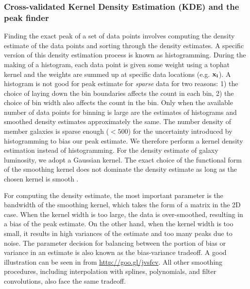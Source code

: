 \subsubsection{Cross-validated Kernel Density Estimation (KDE) and the peak finder} 
\label{subsubsec:KDE}
Finding the exact peak of a set of data points 
involves computing the density estimate of the data points and sorting through
the density estimates. A specific version of this density estimation process is
known as histogramming. During the making of a histogram, each data point is
given some weight using a tophat kernel and the weights are summed up at
specific data locations (e.g. $\bf{x}_i$). 
A histogram is not good for peak estimate for {\it sparse} data for two reasons: 1) the
choice of laying down the bin boundaries affects the count in each bin, 2) the choice of
bin width also affects the count in the bin. Only when the available number of data points
for binning is large are the estimates of histograms and smoothed density
estimates approximately the same. The number density of member galaxies  
is sparse enough ($< 500$) for the uncertainty introduced by histogramming 
to bias our peak estimate. We therefore perform a kernel density estimation
instead of histogramming. 
For the density estimate of galaxy luminosity, 
we adopt a Gaussian kernel. 
The exact choice of the functional form of the smoothing kernel does
not dominate the density estimate as long as the chosen kernel is
smooth \citep{Feigelson2014}. 

For computing the density estimate, the most important parameter  
is the bandwidth of the smoothing kernel, 
which takes the form of a matrix in the 2D case. 
When the kernel width is
too large, the data is over-smoothed, 
resulting in a bias of the peak estimate. On the other hand, when the kernel
width is too small, it results in high variances of the estimate and 
too many peaks due to noise. 
The parameter decision for balancing between the portion of
bias or variance in an estimate is also known as the bias-variance tradeoff. 
A good illustration can be seen in \citealt{Vanderplas2012} from 
\href{http://www.astroml.org/book\_figures/chapter6/fig\_hist\_to\_kernel.html}{http://goo.gl/jvsfcv}.
All other smoothing procedures, including interpolation with splines,
polynomials, and filter convolutions, also face the same tradeoff. 


